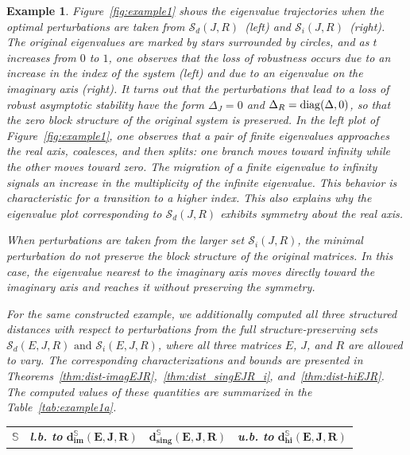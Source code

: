 \documentclass[11pt]{article}
\newtheorem{example}[theorem]{Example}
\newcommand{\diag}     {\mathop{\rm diag}\nolimits}
\begin{document}
\begin{example}
{Figure~\ref{fig:example1} shows the eigenvalue trajectories when the optimal perturbations are taken from $\mathcal S_d(J,R)$~(left) and $\mathcal S_i(J,R)$~(right). The original eigenvalues are marked by stars surrounded by circles, and as $t$ increases from $0$ to $1$, one observes that the loss of robustness occurs due to an increase in the index of the system (left) and due to an eigenvalue on the imaginary axis (right). It turns out that the perturbations that lead to a loss of robust asymptotic stability have the form $\Delta_J=0 $ and $\Delta_R=\diag(\Delta,0)$, so that the zero block structure of the original system is preserved. In the left plot of Figure~\ref{fig:example1}, one observes that a pair of finite eigenvalues approaches the real axis, coalesces, and then splits: one branch moves toward infinity while the other moves toward zero. The migration of a finite eigenvalue to infinity signals  an increase in the multiplicity of the infinite eigenvalue. This behavior is characteristic for a transition to a higher index. This also explains why the eigenvalue plot corresponding to $\mathcal S_d(J,R)$ exhibits symmetry about the real axis.

When perturbations are taken from the larger set $\mathcal S_i(J,R)$, the minimal perturbation do not preserve the block structure of the original matrices. In this case, the eigenvalue nearest to the imaginary axis moves directly toward the imaginary axis and reaches it without preserving the symmetry.

For the same constructed example, we additionally computed all three structured distances with respect to perturbations from the full structure-preserving sets $\mathcal S_d(E,J,R) \text{ and }\mathcal S_i(E,J,R)$, where all three matrices $E$, $J$, and $R$ are allowed to vary. The corresponding characterizations and bounds are presented in Theorems~\ref{thm:dist-imagEJR},~\ref{thm:dist_singEJR_i}, and~\ref{thm:dist-hiEJR}.
The computed values of these quantities are summarized in the Table~\ref{tab:example1a}.
    \begin{table}[h!]
        \centering
        \renewcommand{\arraystretch}{1.5}
        \begin{tabular}{cccc}
            \hline
            \textbf{$\mathbb  S$}
            & \textbf{l.b. to} $\mathbf{d_{im}^{\mathbb S}(E,J,R)}$
            & $\mathbf{d_{sing}^{\mathbb S}(E,J,R)}$
            & \textbf{u.b. to} $\mathbf{d_{hi}^{\mathbb S}(E,J,R)}$ \\


\end{tabular}
\end{table}}
\end{example}
\end{document}
